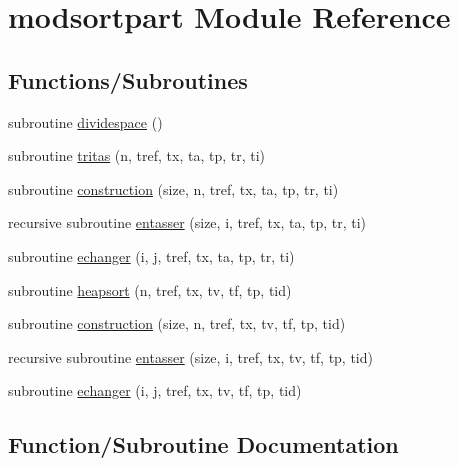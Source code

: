 \hypertarget{namespacemodsortpart}{}\section{modsortpart Module Reference}
\label{namespacemodsortpart}
\subsection*{Functions/\+Subroutines}
\begin{DoxyCompactItemize}
\item 
subroutine \hyperlink{namespacemodsortpart_a45cee800346ecf7b0cdc0c235bd06c48}{dividespace} ()
\item 
subroutine \hyperlink{namespacemodsortpart_a1a6a9f53783f2139141e9064f49d2f1b}{tritas} (n, tref, tx, ta, tp, tr, ti)
\item 
subroutine \hyperlink{namespacemodsortpart_a18d32ea34d090d81f8f618e593860e72}{construction} (size, n, tref, tx, ta, tp, tr, ti)
\item 
recursive subroutine \hyperlink{namespacemodsortpart_a237cc515810e4aa5203ebead3f59a3a7}{entasser} (size, i, tref, tx, ta, tp, tr, ti)
\item 
subroutine \hyperlink{namespacemodsortpart_a0b24fe38ef401030203a179425190ba9}{echanger} (i, j, tref, tx, ta, tp, tr, ti)
\item 
subroutine \hyperlink{namespacemodsortpart_aa3fa8de94821d20599528fffd223a0b1}{heapsort} (n, tref, tx, tv, tf, tp, tid)
\item 
subroutine \hyperlink{namespacemodsortpart_a22ac7a574e86139261a41a3380b63b5a}{construction} (size, n, tref, tx, tv, tf, tp, tid)
\item 
recursive subroutine \hyperlink{namespacemodsortpart_a5d085df72d2f718f2b8d37a434a5511d}{entasser} (size, i, tref, tx, tv, tf, tp, tid)
\item 
subroutine \hyperlink{namespacemodsortpart_a8c03f207ba984156927802e30e176e56}{echanger} (i, j, tref, tx, tv, tf, tp, tid)
\end{DoxyCompactItemize}


\subsection{Function/\+Subroutine Documentation}
